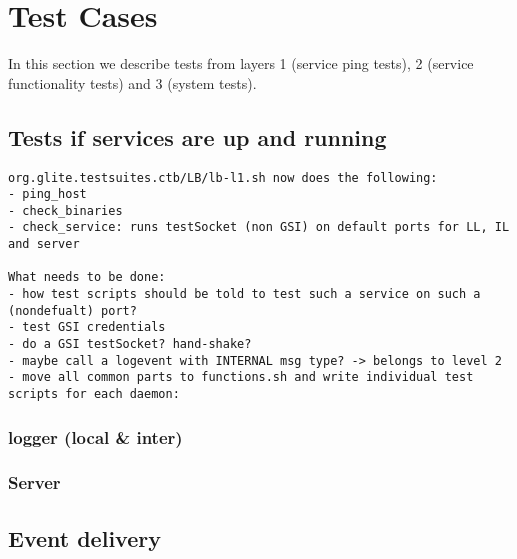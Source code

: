 \section{Test Cases}
\label{s:tests}

In this section we describe tests from layers 1 (service ping tests), 
2 (service functionality tests) and 3 (system tests). 



\subsection{Tests if services are up and running}

\begin{verbatim}
org.glite.testsuites.ctb/LB/lb-l1.sh now does the following:
- ping_host
- check_binaries
- check_service: runs testSocket (non GSI) on default ports for LL, IL and server

What needs to be done:
- how test scripts should be told to test such a service on such a (nondefualt) port?
- test GSI credentials
- do a GSI testSocket? hand-shake? 
- maybe call a logevent with INTERNAL msg type? -> belongs to level 2
- move all common parts to functions.sh and write individual test scripts for each daemon:
\end{verbatim}

\subsubsection{logger (local \& inter)}

\subsubsection{Server}


\subsection{Event delivery}

